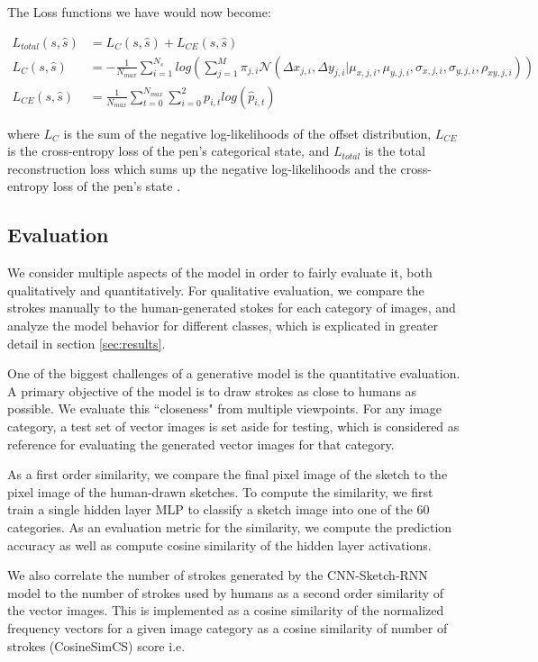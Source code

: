 \documentclass{article}
\begin{document}
The Loss functions we have would now become:

\begin{align*}
L_{total}(s, \hat{s}) &= L_{C}(s, \hat{s}) + L_{CE}(s, \hat{s})\\
L_{C}(s, \hat{s}) &= -\frac{1}{N_{max}} \sum_{i=1}^{N_{s}} log(\sum_{j=1}^{M} \pi_{j,i} \mathcal{N}(\Delta x_{j, i}, \Delta y_{j, i} | \mu_{x, j, i}, \mu_{y, j, i}, \sigma_{x, j, i}, \sigma_{y, j, i}, \rho_{xy, j, i}))\\
L_{CE}(s, \hat{s}) &= \frac{1}{N_{max}} \sum_{t=0}^{N_{max}} \sum_{i=0}^{2} p_{i,t} log(\hat{p}_{i,t})
\end{align*}

where $L_{C}$ is the sum of the negative log-likelihoods of the offset distribution, $L_{CE}$ is the cross-entropy loss of the pen's categorical state, and $L_{total}$ is the total reconstruction loss which sums up the negative log-likelihoods and the cross-entropy loss of the pen's state \cite{qdpaper}.

\subsection{Evaluation} \label{sec:eval}

We consider multiple aspects of the model in order to fairly evaluate it, both qualitatively and quantitatively. For qualitative evaluation, we compare the strokes manually to the human-generated stokes for each category of images, and analyze the model behavior for different classes, which is explicated in greater detail in section \ref{sec:results}.

One of the biggest challenges of a generative model is the quantitative evaluation. A primary objective of the model is to draw strokes as close to humans as possible. We evaluate this ``closeness" from multiple viewpoints. For any image category, a test set of vector images is set aside for testing, which is considered as reference for evaluating the generated vector images for that category. 

As a first order similarity, we compare the final pixel image of the sketch to the pixel image of the human-drawn sketches. To compute the similarity, we first train a single hidden layer MLP to classify a sketch image into one of the 60 categories. As an evaluation metric for the similarity, we compute the prediction accuracy as well as compute cosine similarity of the hidden layer activations.

We also correlate the number of strokes generated by the CNN-Sketch-RNN model to the number of strokes used by humans as a second order similarity of the vector images. This is implemented as a cosine similarity of the normalized frequency vectors for a given image category as a cosine similarity of number of strokes (CosineSimCS) score i.e. 
\end{document}
